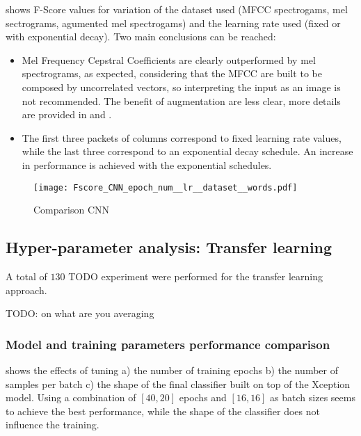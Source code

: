  shows F-Score values for
variation of
the dataset used (MFCC spectrogams, mel sectrograms, agumented mel spectrogams)
and the learning rate used (fixed or with exponential decay).
Two main conclusions can be reached:
\begin{itemize}
    \item 
        Mel Frequency Cepstral Coefficients are clearly outperformed by mel
        spectrograms, as expected, considering that the MFCC are built to be composed
        by uncorrelated vectors, so interpreting the input as an image is not
        recommended.
        The benefit of augmentation are less clear, more details are provided
        in  and
        .
    \item 
        The first three packets of columns correspond to fixed learning rate values,
        while the last three correspond to an exponential decay schedule.
        An increase in performance is achieved with the exponential schedules.
\end{itemize}

\begin{figure*}[h!]
    \centering
    \texttt{[image: Fscore\_CNN\_epoch\_num\_\_lr\_\_dataset\_\_words.pdf]}
    \caption{Comparison CNN}%
    \label{fig:cnn_comparison_epoch_lr_dataset}
\end{figure*}

\subsection{Hyper-parameter analysis: Transfer learning}

A total of $130$ TODO experiment were performed for the transfer learning approach.

TODO: on what are you averaging

\subsubsection{Model and training parameters performance comparison}

 shows the effects of tuning
a)
the number of training epochs
b)
the number of samples per batch
c)
the shape of the final classifier built on top of the Xception model.
Using a combination of $[40, 20]$ epochs and $[16, 16]$ as batch sizes seems to
achieve the best performance, while the shape of the classifier does not
influence the training.

